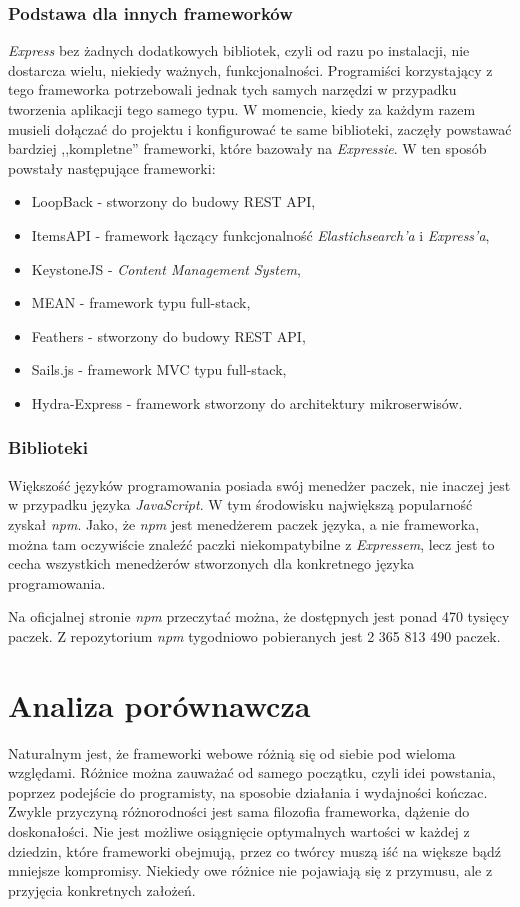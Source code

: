\documentclass[mgr,oneside]{mgr}
\begin{document}
\subsection{Podstawa dla innych frameworków}
\textit{Express} bez żadnych dodatkowych bibliotek, czyli od razu po instalacji, nie dostarcza wielu, niekiedy ważnych, funkcjonalności. Programiści korzystający z tego frameworka potrzebowali jednak tych samych narzędzi w przypadku tworzenia aplikacji tego samego typu. W momencie, kiedy za każdym razem musieli dołączać do projektu i konfigurować te same biblioteki, zaczęły powstawać bardziej ,,kompletne'' frameworki, które bazowały na \textit{Expressie}. W ten sposób powstały następujące frameworki:
\begin{itemize}
  \item LoopBack - stworzony do budowy REST API,
  \item ItemsAPI - framework łączący funkcjonalność \textit{Elastichsearch'a} i \textit{Express'a},
  \item KeystoneJS - \textit{Content Management System},
  \item MEAN - framework typu full-stack,
  \item Feathers - stworzony do budowy REST API,
  \item Sails.js - framework MVC typu full-stack,
  \item Hydra-Express - framework stworzony do architektury mikroserwisów.
\end{itemize}

\subsection{Biblioteki}
Większość języków programowania posiada swój menedżer paczek, nie inaczej jest w przypadku języka \textit{JavaScript}. W tym środowisku największą popularność zyskał \textit{npm}. Jako, że \textit{npm} jest menedżerem paczek języka, a nie frameworka, można tam oczywiście znaleźć paczki niekompatybilne z \textit{Expressem}, lecz jest to cecha wszystkich menedżerów stworzonych dla konkretnego języka programowania.

Na oficjalnej stronie \textit{npm} \cite{npm_site} przeczytać można, że dostępnych jest ponad 470 tysięcy paczek. Z repozytorium \textit{npm} tygodniowo pobieranych jest 2 365 813 490 paczek.

\chapter{Analiza porównawcza}
Naturalnym jest, że frameworki webowe różnią się od siebie pod wieloma względami. Różnice można zauważać od samego początku, czyli idei powstania, poprzez podejście do programisty, na sposobie działania i wydajności kończac. Zwykle przyczyną różnorodności jest sama filozofia frameworka, dążenie do doskonałości. Nie jest możliwe osiągnięcie optymalnych wartości w każdej z dziedzin, które frameworki obejmują, przez co twórcy muszą iść na większe bądź mniejsze kompromisy. Niekiedy owe różnice nie pojawiają się z przymusu, ale z przyjęcia konkretnych założeń.
\end{document}
